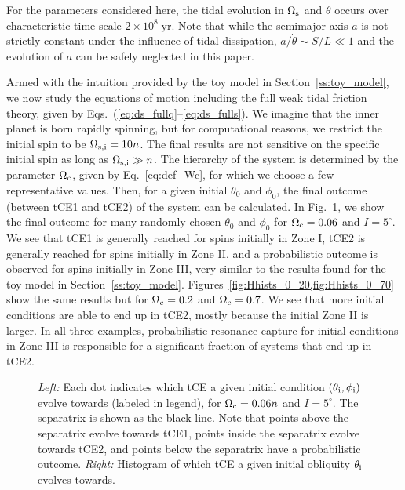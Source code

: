 \documentclass[
        fleqn,
        usenatbib,
    ]{mnras}
\begin{document}
For the parameters considered here, the tidal evolution in $\Omega_{\rm s}$ and
$\theta$ occurs over characteristic time scale $2 \times 10^8\;\mathrm{yr}$.
Note that while the semimajor axis $a$ is not strictly constant under the
influence of tidal dissipation, $\dot{a} / \dot{\theta} \sim S / L \ll 1$
\citep{lai2012} and the evolution of $a$ can be safely neglected in this paper.

Armed with the intuition provided by the toy model in
Section~\ref{ss:toy_model}, we now study the equations of motion including the
full weak tidal friction theory, given by
Eqs.~(\ref{eq:ds_fullq}--\ref{eq:ds_fulls}). We imagine that the inner planet is
born rapidly spinning, but for computational reasons, we restrict the initial
spin to be $\Omega_{\rm s, i} = 10n$. The final results are not sensitive on the
specific initial spin as long as $\Omega_{\rm s, i} \gg n$. The hierarchy of the
system is determined by the parameter $\Omega_{\rm c}$, given by
Eq.~\eqref{eq:def_Wc}, for which we choose a few representative values. Then,
for a given initial $\theta_0$ and $\phi_0$, the final outcome (between tCE1 and
tCE2) of the system can
be calculated. In Fig.~\ref{fig:Hhists_0_06}, we show the final outcome for many
randomly chosen $\theta_0$ and $\phi_0$ for $\Omega_{\rm c} = 0.06$ and $I =
5^\circ$. We see that tCE1 is generally reached for spins initially in Zone I,
tCE2 is generally reached for spins initially in Zone II, and a probabilistic
outcome is observed for spins initially in Zone III, very similar to the results
found for the toy model in Section~\ref{ss:toy_model}.
Figures~\ref{fig:Hhists_0_20,fig:Hhists_0_70} show the same results but for
$\Omega_{\rm c} = 0.2$ and $\Omega_{\rm c} = 0.7$. We see that more initial
conditions are able to end up in tCE2, mostly because the initial Zone II is
larger. In all three examples, probabilistic resonance capture for initial
conditions in Zone III is responsible for a significant fraction of systems that
end up in tCE2.
\begin{figure}
    \centering
    \caption{\emph{Left:} Each dot indicates which tCE a given initial condition
    $(\theta_{\rm i}, \phi_{\rm i})$ evolve towards (labeled in legend), for
    $\Omega_{\rm c} = 0.06n$ and $I = 5^\circ$. The
    separatrix is shown as the black line. Note that points above the
    separatrix evolve towards tCE1, points inside the separatrix evolve towards
    tCE2, and points below the separatrix have a probabilistic outcome.
    \emph{Right:} Histogram of which tCE a given initial obliquity $\theta_{\rm
    i}$ evolves towards.}\label{fig:Hhists_0_06}
\end{figure}
\end{document}
